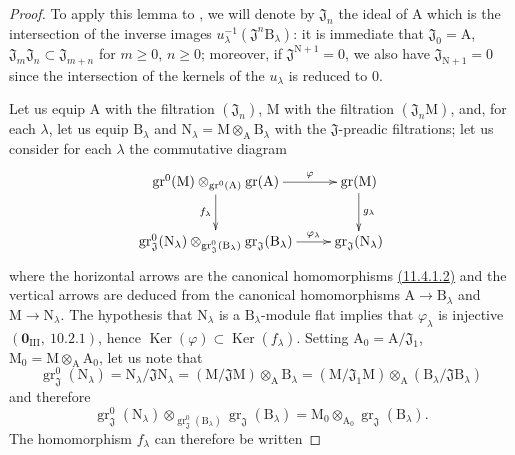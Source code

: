 \begin{proof}
To apply this lemma to , we will denote by $\mathfrak{J}_n$ the ideal of $\mathrm{A}$ which is the intersection
of the inverse images $u_\lambda^{-1}(\mathfrak{J}^n\mathrm{B}_\lambda)$: it is immediate that $\mathfrak{J}_0=\mathrm{A}$, $\mathfrak{J}_m\mathfrak{J}_n\subset\mathfrak{J}_{m+n}$
for $m\geq 0$, $n\geq 0$; moreover, if $\mathfrak{J}^{\mathrm{N}+1}=0$, we also have $\mathfrak{J}_{\mathrm{N}+1}=0$ since the intersection of the
kernels of the $u_\lambda$ is reduced to $0$.

Let us equip $\mathrm{A}$ with the filtration $(\mathfrak{J}_n)$, $\mathrm{M}$ with the filtration $(\mathfrak{J}_n\mathrm{M})$, and, for each $\lambda$,
let us equip $\mathrm{B}_\lambda$ and $\mathrm{N}_\lambda=\mathrm{M}\otimes_\mathrm{A}\mathrm{B}_\lambda$ with the $\mathfrak{J}$-preadic filtrations; let us consider for each $\lambda$ the
commutative diagram
\[
\xymatrix{
\operatorname{gr}^0(\mathrm{M})\otimes_{\operatorname{gr}^0(\mathrm{A})}\operatorname{gr}(\mathrm{A}) \ar[r]^-{\varphi} \ar[d]_{f_\lambda} & \operatorname{gr}(\mathrm{M}) \ar[d]^{g_\lambda} \\
\operatorname{gr}^0_\mathfrak{J}(\mathrm{N}_\lambda)\otimes_{\operatorname{gr}^0_\mathfrak{J}(\mathrm{B}_\lambda)}\operatorname{gr}_\mathfrak{J}(\mathrm{B}_\lambda) \ar[r]^-{\varphi_\lambda} & \operatorname{gr}_\mathfrak{J}(\mathrm{N}_\lambda)
}
\]
where the horizontal arrows are the canonical homomorphisms \hyperref[IV.11.4.1.2]{(11.4.1.2)} and the vertical
arrows are deduced from the canonical homomorphisms $\mathrm{A}\to\mathrm{B}_\lambda$ and $\mathrm{M}\to\mathrm{N}_\lambda$. The hypothesis
that $\mathrm{N}_\lambda$ is a $\mathrm{B}_\lambda$-module flat implies that $\varphi_\lambda$ is injective $(\mathbf{0}_{\mathrm{III}},~10.2.1)$, hence
$\operatorname{Ker}(\varphi)\subset\operatorname{Ker}(f_\lambda)$. Setting $\mathrm{A}_0=\mathrm{A}/\mathfrak{J}_1$, $\mathrm{M}_0=\mathrm{M}\otimes_\mathrm{A}\mathrm{A}_0$, let us note that
\[
\operatorname{gr}^0_\mathfrak{J}(\mathrm{N}_\lambda)=\mathrm{N}_\lambda/\mathfrak{J}\mathrm{N}_\lambda=(\mathrm{M}/\mathfrak{J}\mathrm{M})\otimes_\mathrm{A}\mathrm{B}_\lambda=(\mathrm{M}/\mathfrak{J}_1\mathrm{M})\otimes_{\mathrm{A}}(\mathrm{B}_\lambda/\mathfrak{J}\mathrm{B}_\lambda)
\]
and therefore
\[
\operatorname{gr}^0_\mathfrak{J}(\mathrm{N}_\lambda)\otimes_{\operatorname{gr}^0_\mathfrak{J}(\mathrm{B}_\lambda)}\operatorname{gr}_\mathfrak{J}(\mathrm{B}_\lambda)=\mathrm{M}_0\otimes_{\mathrm{A}_0}\operatorname{gr}_\mathfrak{J}(\mathrm{B}_\lambda).
\]
The homomorphism $f_\lambda$ can therefore be written

\end{proof}
